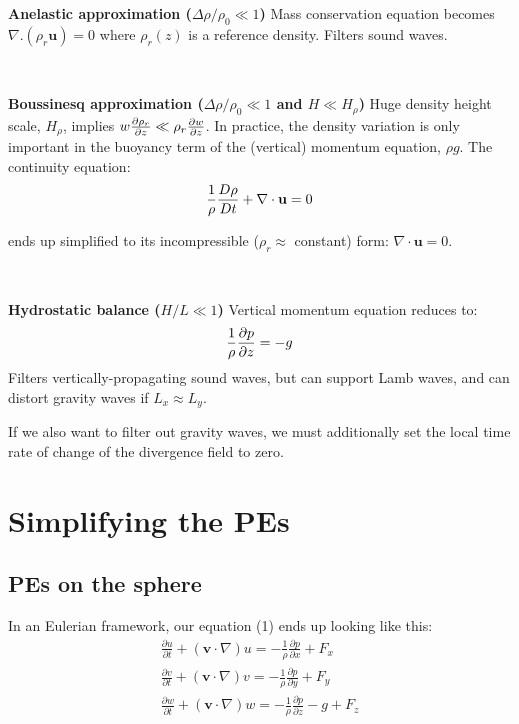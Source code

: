 {\bf Anelastic approximation ($\Delta \rho /\rho_0 \ll 1$)} Mass conservation equation becomes $\nabla.(\rho_r {\mathbf u})=0$
where $\rho_r(z)$ is a reference density.
Filters sound waves.

~

{\bf Boussinesq approximation ($\Delta \rho /\rho_0 \ll 1$ and $H\ll H_{\rho}$)} Huge density height scale, $H_{\rho}$, implies $w \frac{\partial \rho_r}{\partial z}\ll
\rho_r \frac{\partial w}{\partial z}$. In practice, the density variation is only important in the buoyancy term of the (vertical) momentum equation, $\rho g$. The continuity equation:
\begin{equation}
	\frac{1}{\rho} \frac{D \rho}{D t} + \nabla \cdot \mathbf{u} = 0
\end{equation}

ends up simplified to its incompressible ($\rho_r \approx$ constant) form: $\nabla \cdot \mathbf{u} = 0$. 

~

{\bf Hydrostatic balance ($H/L \ll 1$)} Vertical momentum equation reduces to:
\begin{equation}
	\frac{1}{\rho}\frac{\partial p}{\partial z}=-g
	\label{hydrostatic}
\end{equation}
Filters vertically-propagating sound waves, but can support Lamb waves, and can distort gravity waves if $L_x \approx L_y$.

If we also want to filter out gravity waves, we must additionally set the local time rate of change of the divergence field to zero.


\section{Simplifying the PEs}
\subsection{PEs on the sphere}
In an Eulerian framework, our equation (1) ends up looking like this:
\begin{eqnarray}
	\frac {\partial u}{\partial t} + \left(\mathbf{v}\cdot\nabla\right)u=-\frac{1}{\rho} \frac{\partial p}{\partial x}+F_x \\
	\frac {\partial v}{\partial t} + \left(\mathbf{v}\cdot\nabla\right)v=-\frac{1}{\rho} \frac{\partial p}{\partial y}+F_y \\
	\frac {\partial w}{\partial t} + \left(\mathbf{v}\cdot\nabla\right)w=-\frac{1}{\rho} \frac{\partial p}{\partial z}-g+F_z
\end{eqnarray}

